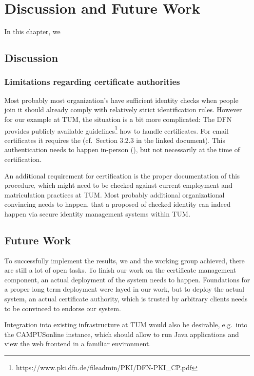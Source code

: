 \chapter{Discussion and Future Work}\label{ch:futureWork}

In this chapter, we

\section*{Discussion}

\subsection*{Limitations regarding certificate authorities}
Most probably most organization's have sufficient identity checks when people join it should already comply with
relatively strict identification rules.
However for our example at TUM, the situation is a bit more complicated:
The DFN provides publicly available guidelines\footnote{https://www.pki.dfn.de/fileadmin/PKI/DFN-PKI_CP.pdf} how to
handle certificates.
For email certificates it requires the  (cf.\ Section 3.2.3 in the linked
document).
This authentication needs to happen in-person (), but not necessarily at the time of
certification.

An additional requirement for certification is the proper documentation of this procedure, which might need to be
checked against current employment and matriculation practices at TUM\@.
Most probably additional organizational convincing needs to happen, that a proposed  of checked identity
can indeed happen via secure identity management systems within TUM\@.

\section*{Future Work}
To successfully implement the results, we and the working group  achieved, there are still a lot of
open tasks.
To finish our work on the certificate management component, an actual deployment of the system needs to happen.
Foundations for a proper long term deployment were layed in our work, but to deploy the actual system,
an actual certificate authority, which is trusted by arbitrary clients needs to be convinced to endorse our system.

Integration into existing infrastructure at TUM would also be desirable, e.g.\ into the CAMPUSonline instance, which
should allow to run Java applications and view the web frontend in a familiar environment.

